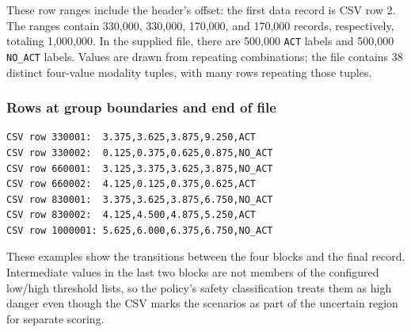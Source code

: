 \documentclass[11pt]{article}
\begin{document}
These row ranges include the header's offset: the first data record is CSV
row 2. The ranges contain 330,000, 330,000, 170,000, and 170,000 records,
respectively, totaling 1,000,000. In the supplied file, there are 500,000
\texttt{ACT} labels and 500,000 \texttt{NO\_ACT} labels. Values are drawn
from repeating combinations; the file contains 38 distinct four-value
modality tuples, with many rows repeating those tuples.

\subsubsection{Rows at group boundaries and end of file}

\begin{lstlisting}[basicstyle=\ttfamily\small]
CSV row 330001:  3.375,3.625,3.875,9.250,ACT
CSV row 330002:  0.125,0.375,0.625,0.875,NO_ACT
CSV row 660001:  3.125,3.375,3.625,3.875,NO_ACT
CSV row 660002:  4.125,0.125,0.375,0.625,ACT
CSV row 830001:  3.375,3.625,3.875,6.750,NO_ACT
CSV row 830002:  4.125,4.500,4.875,5.250,ACT
CSV row 1000001: 5.625,6.000,6.375,6.750,NO_ACT
\end{lstlisting}

These examples show the transitions between the four blocks and the final
record. Intermediate values in the last two blocks are not members of the
configured low/high threshold lists, so the policy's safety classification
treats them as high danger even though the CSV marks the scenarios as part of
the uncertain region for separate scoring.
\end{document}
